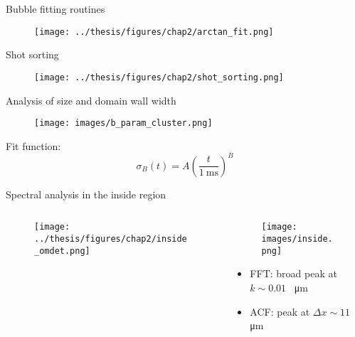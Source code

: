 \documentclass[aspectratio=169]{beamer}
\begin{document}
\begin{frame}{Bubble fitting routines}
  \begin{figure}
      \centering
      \texttt{[image: ../thesis/figures/chap2/arctan\_fit.png]}
  \end{figure}
\end{frame}

\begin{frame}{Shot sorting}
  \begin{figure}
      \centering
      \texttt{[image: ../thesis/figures/chap2/shot\_sorting.png]}
  \end{figure}
\end{frame}

\begin{frame}{Analysis of size and domain wall width}
  \begin{minipage}{0.70\textwidth}
    \begin{figure}
        \centering
        \texttt{[image: images/b\_param\_cluster.png]}
    \end{figure}
  \end{minipage}
  \hspace{0.01\textwidth}
  \begin{minipage}{0.27\textwidth}
    Fit function:
    \[
      \sigma_B(t) = A\left(\frac{t}{1\ \unit{\milli\second}}\right)^B
    \]  
  \end{minipage}
\end{frame}

\begin{frame}{Spectral analysis in the inside region}
  \begin{columns}
    \begin{column}{0.7\textwidth}
      \begin{figure}
        \centering
        \texttt{[image: ../thesis/figures/chap2/inside\_omdet.png]}
      \end{figure}
    \end{column}
    \begin{column}{0.3\textwidth}
      \hspace{-0.2\textheight}
      \begin{figure}
        \centering
        \texttt{[image: images/inside.png]}
      \end{figure}
      \hspace{0.2\textheight}
      \begin{itemize}
        \item FFT: broad peak at $k \sim 0.01$ \unit{\per\micro\meter}
        \item ACF: peak at $\Delta x \sim 11$ \unit{\micro\meter}
      \end{itemize}
    \end{column}
  \end{columns}
  
\end{frame}
\end{document}
